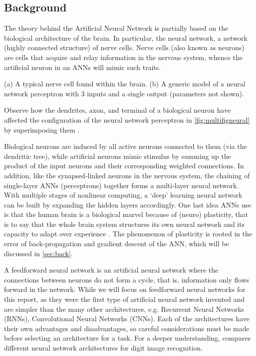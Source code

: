 \subsection{Background}\label{sec:background} 
The theory behind the Artificial Neural Network is partially based on the biological architecture of the brain. In particular, the neural network, a network (highly connected structure) of nerve cells. Nerve cells (also known as neurons) are cells that acquire and relay information in the nervous system, whence the artificial neuron in an ANNs will mimic such traits. 
\begin{figh}
    
    \caption{(a) A typical nerve cell found within the brain. (b) A generic model of a neural network perceptron with 3 inputs and a single output (parameters not shown).}
    \label{fig:multifigneural}
\end{figh}
Observe how the dendrites, axon, and terminal of a biological neuron have affected the configuration of the neural network perceptron in \autoref{fig:multifigneural} by superimposing them \parencite{bio}. 

Biological neurons are induced by all active neurons connected to them (via the dendritic tree), while artificial neurons mimic stimulus by summing up the product of the input neurons and their corresponding weighted connections. In addition, like the synapsed-linked neurons in the nervous system, the chaining of single-layer ANNs (perceptrons) together forms a multi-layer neural network. With multiple stages of nonlinear computing, a `deep' learning neural network can be built by expanding the hidden layers accordingly. One last idea ANNs use is that the human brain is a biological marvel because of (neuro) plasticity, that is to say that the whole brain system structures its own neural network and its capacity to adapt over experience \parencite{MCEWEN20188}. The phenomenon of plasticity is rooted in the error of back-propagation and gradient descent of the ANN, which will be discussed in \autoref{sec:back}.

A feedforward neural network is an artificial neural network where the connections between neurons do not form a cycle, that is, information only flows forward in the network. While we will focus on feedforward neural networks for this report, as they were the first type of artificial neural network invented and are simpler than the many other architectures, e.g. Recurrent Neural Networks (RNNs), Convolutional Neural Networks (CNNs). Each of the architectures have their own advantages and disadvantages, so careful considerations must be made before selecting an architecture for a task. For a deeper understanding, \textcite{arc} compares different neural network architectures for digit image recognition.

